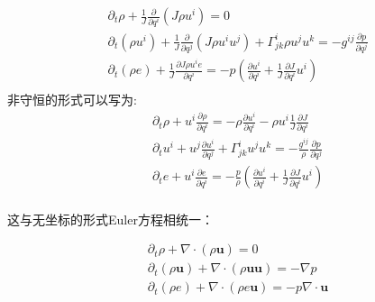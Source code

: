 \documentclass[LBMDerivation.tex]{subfiles}
\begin{document}
\begin{equation}
  \boxed{
    \begin{aligned}
       & \partial_{t} \rho+\frac{1}{J} \frac{\partial}{\partial q^{i}}\left(J \rho u^{i}\right)=0
      \\
       & \partial_{t}\left(\rho u^{i}\right)+\frac{1}{J} \frac{\partial}{\partial q^{j}}\left(J \rho u^{i} u^{j}\right)+\Gamma_{j k}^{i} \rho u^{j} u^{k}=-g^{i j} \frac{\partial p}{\partial q^{j}} \\
       & \partial_{t}\left(\rho e\right) + \frac{1}{J}\frac{\partial J \rho u^i e}{\partial  q^{i}} = -  p (\frac{\partial  u^i}{\partial q^{i}}  + \frac{1}{J} \frac{\partial J}{\partial q^i}u^i)                        \\
    \end{aligned}
  }
  \label{EQUATION::Eluer} ~
\end{equation}
%
%
非守恒的形式可以写为:
\begin{equation}
  \boxed{
  \begin{aligned}
     & \partial_{t} \rho+ u^i \frac{\partial \rho}{\partial q^i}=-\rho \frac{\partial u^i}{\partial q^i}-\rho u^i \frac{1}{J} \frac{\partial J}{\partial q^i}
    \\
     & \partial_{t}u^{i}+u^j \frac{\partial u^i}{\partial q^{j}}+\Gamma_{j k}^{i}  u^{j} u^{k} =-\frac{g^{i j}}{\rho} \frac{\partial p}{\partial q^{j}}                                                \\
     & \partial_{t}e + u^i\frac{\partial e}{\partial  q^{i}}  = -  \frac{p}{\rho} (\frac{\partial  u^i}{\partial q^{i}}  + \frac{1}{J} \frac{\partial J}{\partial q^i}u^i)                                                 \\
  \end{aligned}
  }
  \label{EQUATION::Eluer非守恒} ~
\end{equation}


这与无坐标的形式Euler方程相统一：


\begin{equation}
  \begin{aligned}
     & \partial_t \rho + \nabla \cdot (\rho \boldsymbol{u})=0                                                      \\
     & \partial_{t}\left(\rho \boldsymbol{u} \right)+ \nabla \cdot (\rho \boldsymbol{u} \boldsymbol{u}) =-\nabla p \\
     & \partial_{t}\left(\rho e \right) + \nabla \cdot (\rho e \boldsymbol{u})=-p \nabla \cdot \boldsymbol{u}      \\
  \end{aligned}
  \label{EQUATION::Eluer2} ~
\end{equation}
%
%
%
%
%
%
\end{document}
